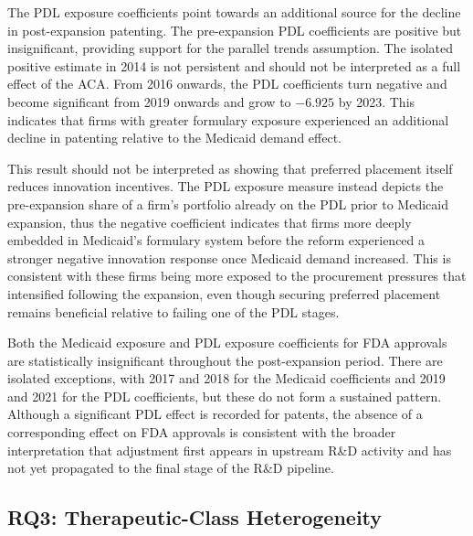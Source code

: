 \documentclass[12pt]{article}
\begin{document}
The PDL exposure coefficients point towards an additional source for the decline in post-expansion patenting. The pre-expansion PDL coefficients are positive but insignificant, providing support for the parallel trends assumption. The isolated positive estimate in 2014 is not persistent and should not be interpreted as a full effect of the ACA. From 2016 onwards, the PDL coefficients turn negative and become significant from 2019 onwards and grow to $-6.925$ by 2023. This indicates that firms with greater formulary exposure experienced an additional decline in patenting relative to the Medicaid demand effect.

This result should not be interpreted as showing that preferred placement itself reduces innovation incentives. The PDL exposure measure instead depicts the pre-expansion share of a firm's portfolio already on the PDL prior to Medicaid expansion, thus the negative coefficient indicates that firms more deeply embedded in Medicaid's formulary system before the reform experienced a stronger negative innovation response once Medicaid demand increased. This is consistent with these firms being more exposed to the procurement pressures that intensified following the expansion, even though securing preferred placement remains beneficial relative to failing one of the PDL stages.

Both the Medicaid exposure and PDL exposure coefficients for FDA approvals are statistically insignificant throughout the post-expansion period. There are isolated exceptions, with 2017 and 2018 for the Medicaid coefficients and 2019 and 2021 for the PDL coefficients, but these do not form a sustained pattern. Although a significant PDL effect is recorded for patents, the absence of a corresponding effect on FDA approvals is consistent with the broader interpretation that adjustment first appears in upstream R\&D activity and has not yet propagated to the final stage of the R\&D pipeline.


\clearpage

\subsection{RQ3: Therapeutic-Class Heterogeneity}

\begingroup\footnotesize

\label{tab:rq3_feols_exante}
\endgroup
\end{document}
